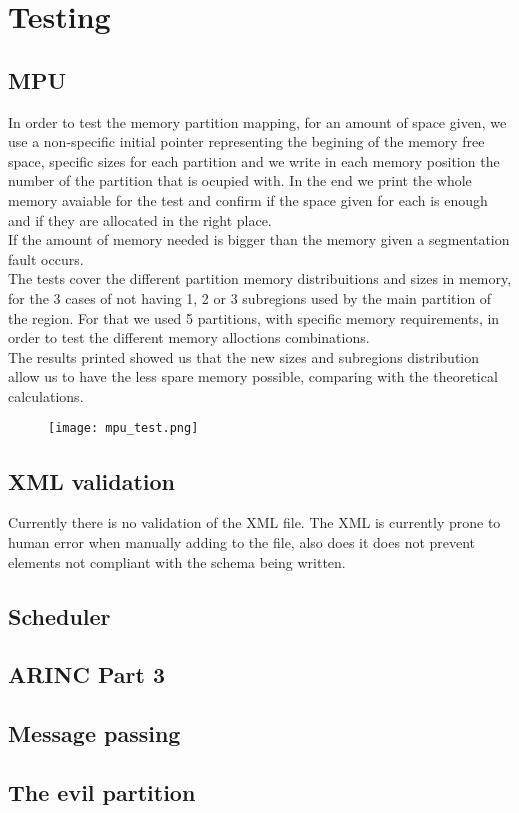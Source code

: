\chapter{Testing}

\section{MPU}
In order to test the memory partition mapping, for an amount of space given, we use a non-specific initial
 pointer representing the begining of the memory free space, specific sizes for each partition and we
  write in each memory position the number of the partition that is ocupied with. In the end we print the
   whole memory avaiable for the test and confirm if the space given for each is enough and if they are
    allocated in the right place.\\
  If the amount of memory needed is bigger than the memory given a segmentation fault occurs.\\
 The tests cover the different partition memory distribuitions and sizes in memory, for the 3 cases of not
  having 1, 2 or  3 subregions used by the main partition of the region. For that we used 5 partitions, with
   specific memory requirements, in order to test the different memory alloctions combinations.\\
  The results printed showed us that the new sizes and subregions distribution allow us to have the less 
  spare memory possible, comparing with the theoretical calculations.\\
\begin{figure}[H]
\centering
\texttt{[image: mpu\_test.png]}
\label{fig:simple_system}
\end{figure}

\section{XML validation}

Currently there is no validation of the XML file. 
The XML is currently prone to human error when manually 
adding to the file, also does it does not prevent elements 
not compliant with the schema being written. 
\\


\section{Scheduler}

\section{ARINC Part 3}

\section{Message passing}

\section{The evil partition}